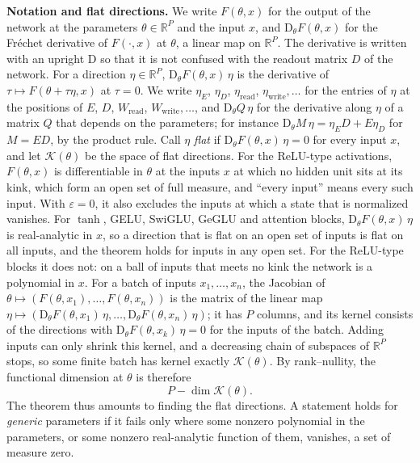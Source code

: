 \documentclass[10pt]{article}
\theoremstyle{definition}
\theoremstyle{remark}
\newcommand{\R}{\mathbb{R}}
\newcommand{\Wread}{W_{\mathrm{read}}}
\newcommand{\Wwrite}{W_{\mathrm{write}}}
\newcommand{\Der}{\mathrm{D}}
\newcommand{\para}[1]{\smallskip\noindent\textbf{#1}\hspace{0.5em}}
\begin{document}
\para{Notation and flat directions.} We write $F(\theta, x)$ for the output of the network at the parameters $\theta \in \R^P$ and the input $x$, and $\Der_\theta F(\theta, x)$ for the Fr\'echet derivative of $F(\cdot, x)$ at $\theta$, a linear map on $\R^P$. The derivative is written with an upright $\Der$ so that it is not confused with the readout matrix $D$ of the network. For a direction $\eta \in \R^P$, $\Der_\theta F(\theta, x)\,\eta$ is the derivative of $\tau \mapsto F(\theta + \tau\eta, x)$ at $\tau = 0$. We write $\eta_E$, $\eta_D$, $\eta_{\mathrm{read}}$, $\eta_{\mathrm{write}}, \dots$ for the entries of $\eta$ at the positions of $E$, $D$, $\Wread$, $\Wwrite, \dots$, and $\Der_\theta Q\,\eta$ for the derivative along $\eta$ of a matrix $Q$ that depends on the parameters; for instance $\Der_\theta M\,\eta = \eta_ED + E\eta_D$ for $M = ED$, by the product rule. Call $\eta$ \emph{flat} if $\Der_\theta F(\theta, x)\,\eta = 0$ for every input $x$, and let $\mathcal K(\theta)$ be the space of flat directions. For the ReLU-type activations, $F(\theta, x)$ is differentiable in $\theta$ at the inputs $x$ at which no hidden unit sits at its kink, which form an open set of full measure, and ``every input'' means every such input. With $\varepsilon = 0$, it also excludes the inputs at which a state that is normalized vanishes. For $\tanh$, GELU, SwiGLU, GeGLU and attention blocks, $\Der_\theta F(\theta, x)\,\eta$ is real-analytic in $x$, so a direction that is flat on an open set of inputs is flat on all inputs, and the theorem holds for inputs in any open set. For the ReLU-type blocks it does not: on a ball of inputs that meets no kink the network is a polynomial in $x$. For a batch of inputs $x_1, \dots, x_n$, the Jacobian of $\theta \mapsto (F(\theta, x_1), \dots, F(\theta, x_n))$ is the matrix of the linear map $\eta \mapsto (\Der_\theta F(\theta, x_1)\,\eta, \dots, \Der_\theta F(\theta, x_n)\,\eta)$; it has $P$ columns, and its kernel consists of the directions with $\Der_\theta F(\theta, x_k)\,\eta = 0$ for the inputs of the batch. Adding inputs can only shrink this kernel, and a decreasing chain of subspaces of $\R^P$ stops, so some finite batch has kernel exactly $\mathcal K(\theta)$. By rank--nullity, the functional dimension at $\theta$ is therefore
\[
P - \dim\mathcal K(\theta).
\]
The theorem thus amounts to finding the flat directions. A statement holds for \emph{generic} parameters if it fails only where some nonzero polynomial in the parameters, or some nonzero real-analytic function of them, vanishes, a set of measure zero.
\end{document}
